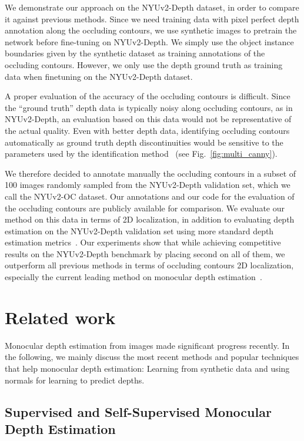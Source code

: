 \documentclass[10pt,twocolumn,letterpaper]{article}
\begin{document}
We demonstrate our  approach on the NYUv2-Depth dataset, in  order to compare it
against  previous methods. Since we need training data with pixel perfect depth 
annotation along the occluding  contours, we use synthetic
images to pretrain the  network  before fine-tuning on NYUv2-Depth. We simply 
use the object instance boundaries given by the synthetic dataset as training 
annotations of the occluding contours.  However, we only use the  depth ground  
truth as  training data  when finetuning  on the  NYUv2-Depth dataset.

A proper  evaluation of  the accuracy  of the  occluding contours  is difficult.
Since  the  ``ground truth''  depth  data  is  typically noisy  along  occluding
contours, as in NYUv2-Depth, an evaluation based on this data would not be 
representative of the actual quality.  Even with better depth data, identifying 
occluding contours automatically as ground truth depth discontinuities would be 
sensitive to the parameters used by the identification method~\cite{Canny} 
(see Fig.~\ref{fig:multi_canny}).

We therefore decided to annotate manually the occluding contours  in a subset 
of 100 images randomly sampled from the NYUv2-Depth validation set, which we 
call the NYUv2-OC dataset. Our annotations and our code for the 
evaluation of the occluding contours are publicly  available for comparison. 
We evaluate our method on this data in terms of 2D localization, in addition 
to evaluating depth estimation on the NYUv2-Depth validation set using more  
standard depth estimation 
metrics~\cite{Eigen14,Eigen2015PredictingDS,Laina2016DeeperDP}.  Our experiments
show  that  while  achieving  competitive results on the NYUv2-Depth  benchmark 
by  placing  second on  all of  them,  we outperform  all previous methods in 
terms of  occluding contours 2D localization, especially the current leading 
method on monocular depth estimation~\cite{Jiao2018LookDI}.

 
\section{Related work}


Monocular depth  estimation from images made  significant progress  recently. 
In the following, we mainly discuss the most recent methods and popular 
techniques  that help monocular  depth estimation: Learning from  
synthetic data and using normals for learning to predict depths.

\subsection{Supervised and Self-Supervised Monocular Depth Estimation}
\end{document}
